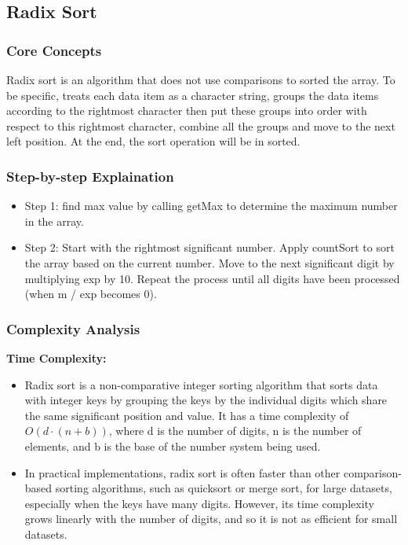 \subsection{Radix Sort}

\subsubsection{Core Concepts}
Radix sort is an algorithm that does not use comparisons to sorted the array. To be specific, treats each data item as a character string, groups the data items according to the rightmost character then put these groups into order with respect to this rightmost character, combine all the groups and move to the next left position. At the end, the sort operation will be in sorted. ~\cite{ref1}

\vspace{3pt}

\subsubsection{Step-by-step Explaination}
\begin{itemize}[label=-]
    \item Step 1: find max value by calling getMax to determine the maximum number in the array.
    \item Step 2: Start with the rightmost significant number. Apply countSort to sort the array based on the current number. Move to the next significant digit by multiplying exp by 10. Repeat the process until all digits have been processed (when m / exp becomes 0).
\end{itemize}

\subsubsection{Complexity Analysis}
\textbf{Time Complexity: }
\begin{itemize}
    \item Radix sort is a non-comparative integer sorting algorithm that sorts data with integer keys by grouping the keys by the individual digits which share the same significant position and value. It has a time complexity of $O(d \cdot (n + b))$, where d is the number of digits, n is the number of elements, and b is the base of the number system being used.
    \item In practical implementations, radix sort is often faster than other comparison-based sorting algorithms, such as quicksort or merge sort, for large datasets, especially when the keys have many digits. However, its time complexity grows linearly with the number of digits, and so it is not as efficient for small datasets. ~\cite{ref5}
\end{itemize}

